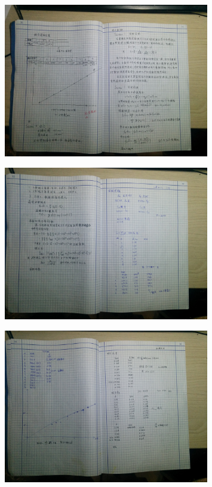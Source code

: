 \documentclass[aps,pre,12pt,preprint,onecolumn,showpacs,showkeys,UTF8]{revtex4-1}
\begin{document}
\begin{figure}[h]
	\begin{center}
		\includegraphics[width=0.8\textwidth]{jiluben1.png}
	\end{center}
\end{figure}
\begin{figure}[h]
	\begin{center}
		\includegraphics[width=0.8\textwidth]{jiluben2.png}
	\end{center}
\end{figure}
\begin{figure}[h]
	\begin{center}
		\includegraphics[width=0.8\textwidth]{jiluben3.png}
	\end{center}
\end{figure}
\end{document}
